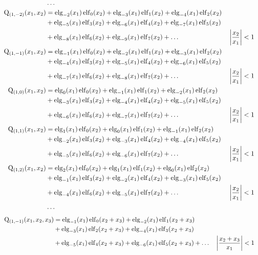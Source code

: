 \begin{equation*} \begin{aligned}
&\ldots \\
%
\mathrm{Q}_{(1,-2)}(x_1, x_2) &=   
  \elg_{-2}(x_1) \elf_0(x_2)
+ \elg_{-3}(x_1) \elf_1(x_2)  
+ \elg_{-4}(x_1) \elf_2(x_2) \\ &
+ \elg_{-5}(x_1) \elf_3(x_2)
+ \elg_{-6}(x_1) \elf_4(x_2)
+ \elg_{-7}(x_1) \elf_5(x_2) \\ &
+ \elg_{-8}(x_1) \elf_6(x_2)
+ \elg_{-9}(x_1) \elf_7(x_2)
+ \ldots & 
&\left| \frac{x_2}{x_1} \right| < 1 \\
%
\mathrm{Q}_{(1,-1)}(x_1, x_2) &=   
  \elg_{-1}(x_1) \elf_0(x_2)
+ \elg_{-2}(x_1) \elf_1(x_2)  
+ \elg_{-3}(x_1) \elf_2(x_2) \\ &
+ \elg_{-4}(x_1) \elf_3(x_2)
+ \elg_{-5}(x_1) \elf_4(x_2)
+ \elg_{-6}(x_1) \elf_5(x_2) \\ &
+ \elg_{-7}(x_1) \elf_6(x_2)
+ \elg_{-8}(x_1) \elf_7(x_2)
+ \ldots & 
&\left| \frac{x_2}{x_1} \right| < 1 \\
%
\mathrm{Q}_{(1,0)}(x_1, x_2) &=   
  \elg_0(x_1) \elf_0(x_2)
+ \elg_{-1}(x_1) \elf_1(x_2)  
+ \elg_{-2}(x_1) \elf_2(x_2) \\ &
+ \elg_{-3}(x_1) \elf_3(x_2)
+ \elg_{-4}(x_1) \elf_4(x_2)
+ \elg_{-5}(x_1) \elf_5(x_2) \\ &
+ \elg_{-6}(x_1) \elf_6(x_2)
+ \elg_{-7}(x_1) \elf_7(x_2)
+ \ldots & 
&\left| \frac{x_2}{x_1} \right| < 1 \\
%
\mathrm{Q}_{(1,1)}(x_1, x_2) &=   
  \elg_1(x_1) \elf_0(x_2)
+ \elg_0(x_1) \elf_1(x_2)
+ \elg_{-1}(x_1) \elf_2(x_2) \\ &
+ \elg_{-2}(x_1) \elf_3(x_2)
+ \elg_{-3}(x_1) \elf_4(x_2)
+ \elg_{-4}(x_1) \elf_5(x_2) \\ &
+ \elg_{-5}(x_1) \elf_6(x_2)
+ \elg_{-6}(x_1) \elf_7(x_2)
+ \ldots & 
&\left| \frac{x_2}{x_1} \right| < 1 \\
%
\mathrm{Q}_{(1,2)}(x_1, x_2) &=   
  \elg_2(x_1) \elf_0(x_2)
+ \elg_1(x_1) \elf_1(x_2)
+ \elg_0(x_1) \elf_2(x_2) \\ &
+ \elg_{-1}(x_1) \elf_3(x_2)
+ \elg_{-2}(x_1) \elf_4(x_2)
+ \elg_{-3}(x_1) \elf_5(x_2) \\ &
+ \elg_{-4}(x_1) \elf_6(x_2)
+ \elg_{-5}(x_1) \elf_7(x_2)
+ \ldots & 
&\left| \frac{x_2}{x_1} \right| < 1 \\
%
&\ldots \\
\end{aligned} \end{equation*}
\begin{equation*} \begin{aligned}
\mathrm{Q}_{(1,-1)}(x_1, x_2, x_3) &=   
  \operatorname{elg}_{-1}(x_1) \operatorname{elf}_0(x_2 + x_3)
+ \operatorname{elg}_{-2}(x_1) \operatorname{elf}_1(x_2 + x_3)  \\ & 
+ \operatorname{elg}_{-3}(x_1) \operatorname{elf}_2(x_2 + x_3)
+ \operatorname{elg}_{-4}(x_1) \operatorname{elf}_3(x_2 + x_3) \\ &
+ \operatorname{elg}_{-5}(x_1) \operatorname{elf}_4(x_2 + x_3)
+ \operatorname{elg}_{-6}(x_1) \operatorname{elf}_5(x_2 + x_3)
+ \ldots & 
&\left| \frac{x_2 + x_3}{x_1} \right| < 1 \\
\end{aligned} \end{equation*}
